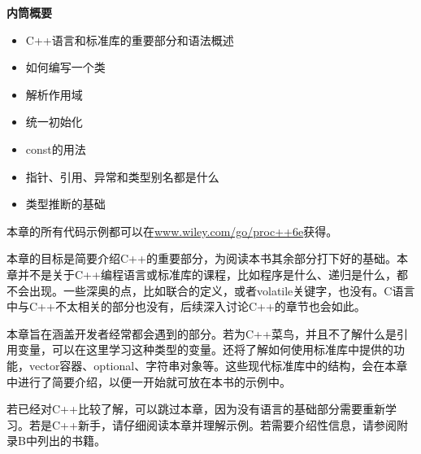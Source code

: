 
\noindent
\textbf{内筒概要}

\begin{itemize}
\item
C++语言和标准库的重要部分和语法概述

\item
如何编写一个类

\item
解析作用域

\item
统一初始化

\item
const的用法

\item
指针、引用、异常和类型别名都是什么

\item
类型推断的基础
\end{itemize}

本章的所有代码示例都可以在\href{http://www.wiley.com/go/proc++6e}{www.wiley.com/go/proc++6e}获得。

本章的目标是简要介绍C++的重要部分，为阅读本书其余部分打下好的基础。本章并不是关于C++编程语言或标准库的课程，比如程序是什么、递归是什么，都不会出现。一些深奥的点，比如联合的定义，或者volatile关键字，也没有。C语言中与C++不太相关的部分也没有，后续深入讨论C++的章节也会如此。

本章旨在涵盖开发者经常都会遇到的部分。若为C++菜鸟，并且不了解什么是引用变量，可以在这里学习这种类型的变量。还将了解如何使用标准库中提供的功能，vector容器、optional、字符串对象等。这些现代标准库中的结构，会在本章中进行了简要介绍，以便一开始就可放在本书的示例中。

若已经对C++比较了解，可以跳过本章，因为没有语言的基础部分需要重新学习。若是C++新手，请仔细阅读本章并理解示例。若需要介绍性信息，请参阅附录B中列出的书籍。








